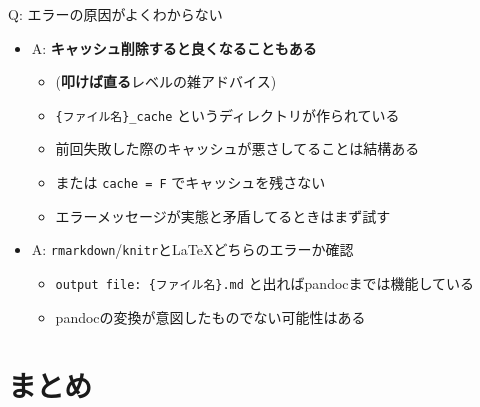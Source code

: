 \documentclass[
  12pt,
  ignorenonframetext,
]{beamer}
\providecommand{\tightlist}{%
  \setlength{\itemsep}{0pt}\setlength{\parskip}{0pt}}
\begin{document}
\begin{frame}[fragile]{Q: エラーの原因がよくわからない}
\protect\hypertarget{q-ux30a8ux30e9ux30fcux306eux539fux56e0ux304cux3088ux304fux308fux304bux3089ux306aux3044}{}

\begin{itemize}
\tightlist
\item
  A: \textbf{キャッシュ削除すると良くなることもある}

  \begin{itemize}
  \tightlist
  \item
    (\textbf{叩けば直る}レベルの雑アドバイス)
  \item
    \texttt{\{ファイル名\}\_cache} というディレクトリが作られている
  \item
    前回失敗した際のキャッシュが悪さしてることは結構ある
  \item
    または \texttt{cache\ =\ F} でキャッシュを残さない
  \item
    エラーメッセージが実態と矛盾してるときはまず試す
  \end{itemize}
\item
  A: \texttt{rmarkdown}/\texttt{knitr}と\LaTeX どちらのエラーか確認

  \begin{itemize}
  \tightlist
  \item
    \texttt{output\ file:\ \{ファイル名\}.md}
    と出ればpandocまでは機能している
  \item
    pandocの変換が意図したものでない可能性はある
  \end{itemize}
\end{itemize}

\end{frame}

\hypertarget{ux307eux3068ux3081}{%
\section{まとめ}\label{ux307eux3068ux3081}}
\end{document}
